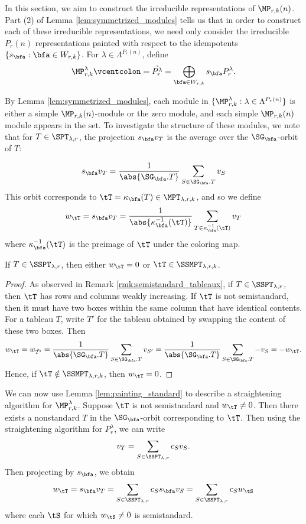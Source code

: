 In this section, we aim to construct the irreducible representations of $\MP_{r,k}(n)$. Part (2) of Lemma \ref{lem:symmetrized_modules} tells us that in order to construct each of these irreducible representations, we need only consider the irreducible $P_r(n)$ representations painted with respect to the idempotents $\{s_\bfa:\bfa\in W_{r,k}\}$. For $\lambda\in\Lambda^{P_r(n)}$, define \[\MP_{r,k}^\lambda\vcentcolon= \tilde{P_r^\lambda}= \bigoplus_{\bfa\in W_{r,k}}s_\bfa P_r^\lambda.\]

By Lemma \ref{lem:symmetrized_modules}, each module in $\{\MP_{r,k}^\lambda:\lambda\in\Lambda^{P_r(n)}\}$ is either a simple $\MP_{r,k}(n)$-module or the zero module, and each simple $\MP_{r,k}(n)$ module appears in the set. To investigate the structure of these modules, we note that for $T\in\SPT_{\lambda,r}$, the projection $s_\bfa v_T$ is the average over the $\SG_\bfa$-orbit of $T$:

\[s_\bfa v_T=\frac{1}{\abs{\SG_\bfa.T}}\sum_{S\in\SG_\bfa.T}v_S\] This orbit corresponds to $\tT=\kappa_\bfa(T)\in\MPT_{\lambda,r,k}$, and so we define \[w_\tT=s_\bfa v_T=\frac{1}{\abs{\kappa_\bfa^{-1}(\tT)}}\sum_{T\in\kappa_\bfa^{-1}(\tT)} v_T\] where $\kappa_\bfa^{-1}(\tT)$ is the preimage of $\tT$ under the coloring map.

\begin{lemma}\label{lem:painting_standard} If $T\in\SSPT_{\lambda,r}$, then either $w_\tT=0$ or $\tT\in\SSMPT_{\lambda,r,k}$.
\end{lemma}

\begin{proof}
    As observed in Remark \ref{rmk:semistandard_tableaux}, if $T\in\SSPT_{\lambda,r}$, then $\tT$ has rows and columns weakly increasing. If $\tT$ is not semistandard, then it must have two boxes within the same column that have identical contents. For a tableau $T$, write $T'$ for the tableau obtained by swapping the content of these two boxes. Then \[w_{\tT}=w_{\tilde{T'}}=\frac{1}{\abs{\SG_\bfa.T}}\sum_{S\in\SG_\bfa.T}v_{S'}=\frac{1}{\abs{\SG_\bfa.T}}\sum_{S\in\SG_\bfa.T}-v_{S}=-w_{\tT}.\] Hence, if $\tT\notin\SSMPT_{\lambda,r,k}$, then $w_\tT=0$.
\end{proof}

We can now use Lemma \ref{lem:painting_standard} to describe a straightening algorithm for $\MP_{r,k}^\lambda$. Suppose $\tT$ is not semistandard and $w_\tT\neq0$. Then there exists a nonstandard $T$ in the $\SG_\bfa$-orbit corresponding to $\tT$. Then using the straightening algorithm for $P_r^\lambda$, we can write \[v_T=\sum_{S\in\SSPT_{\lambda,r}}c_Sv_S.\]
Then projecting by $s_\bfa$, we obtain \[w_\tT=s_\bfa v_T=\sum_{S\in\SSPT_{\lambda,r}} c_S s_\bfa v_S=\sum_{S\in\SSPT_{\lambda,r}} c_S w_\tS\] where each $\tS$ for which $w_{\tS}\neq0$ is semistandard.

